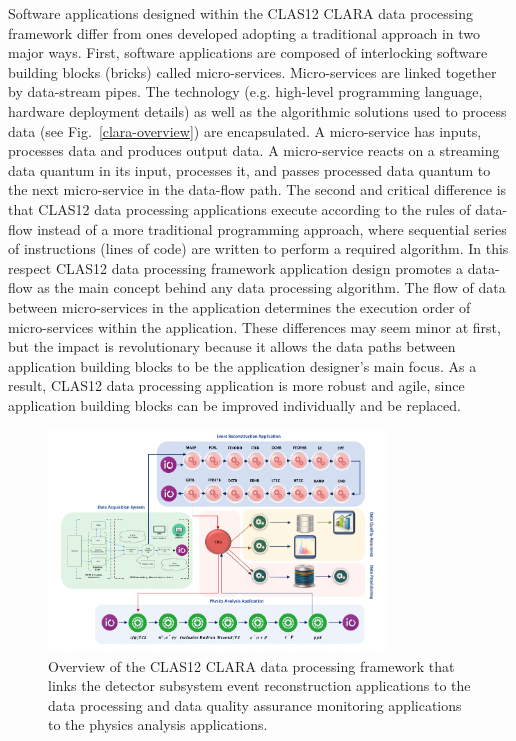 Software applications designed within the CLAS12 CLARA data processing framework differ from ones developed adopting
a traditional approach in two major ways. First, software applications are composed of interlocking software building blocks
(bricks) called micro-services. Micro-services are linked together by data-stream pipes.  The technology
(e.g. high-level programming language, hardware deployment details) as well as the algorithmic solutions used to process
data (see Fig.~\ref{clara-overview}) are encapsulated. A micro-service has inputs, processes data and produces output data.
A micro-service reacts on a streaming data quantum in its input, processes it, and
passes processed data quantum to the next micro-service in the data-flow path. The second and critical difference is
that CLAS12 data processing applications execute according to the rules of data-flow instead of a more traditional
programming approach, where sequential series of instructions (lines of code) are written to perform a required algorithm.
In this respect CLAS12 data processing framework application design promotes a data-flow as the main concept
behind any data processing algorithm.   The flow of data between micro-services in the application determines
the execution order of micro-services within the application. These differences may seem minor at first, but
the impact is revolutionary because it allows the data paths between application building blocks to be the
application designer’s main focus. As a result, CLAS12 data processing application is more robust and agile, since
application building blocks can be improved individually and be replaced.

\begin{figure}
\centering
\includegraphics[width=0.8\textwidth]{pics/clara-overview.pdf}
\caption{Overview of the CLAS12 CLARA data processing framework that links the detector subsystem
event reconstruction applications to the data processing and data quality assurance monitoring applications
to the physics analysis applications.}
\label{fig:clara-overview}
\end{figure}

